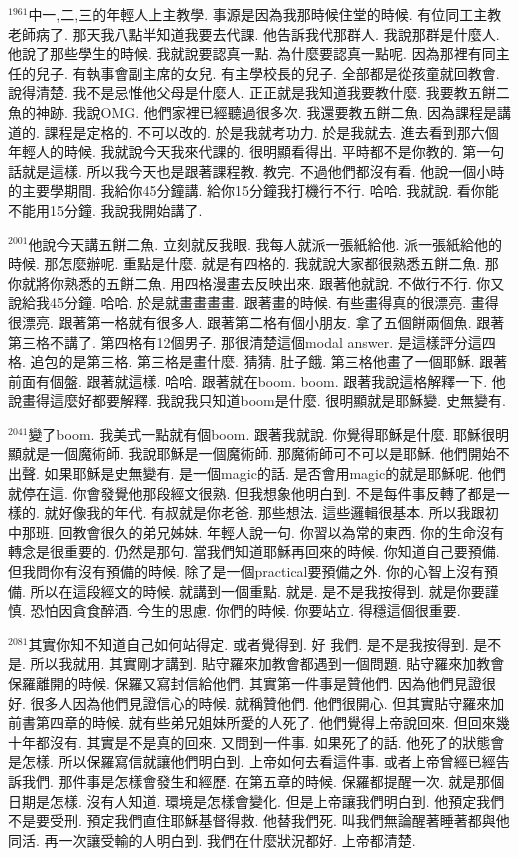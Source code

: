 \documentclass{book}
\begin{document}
$^{1961}$中一,二,三的年輕人上主教學.
事源是因為我那時候住堂的時候.
有位同工主教老師病了.
那天我八點半知道我要去代課.
他告訴我代那群人.
我說那群是什麼人.
他說了那些學生的時候.
我就說要認真一點.
為什麼要認真一點呢.
因為那裡有同主任的兒子.
有執事會副主席的女兒.
有主學校長的兒子.
全部都是從孩童就回教會.
說得清楚.
我不是忌惟他父母是什麼人.
正正就是我知道我要教什麼.
我要教五餅二魚的神跡.
我說OMG.
他們家裡已經聽過很多次.
我還要教五餅二魚.
因為課程是講道的.
課程是定格的.
不可以改的.
於是我就考功力.
於是我就去.
進去看到那六個年輕人的時候.
我就說今天我來代課的.
很明顯看得出.
平時都不是你教的.
第一句話就是這樣.
所以我今天也是跟著課程教.
教完.
不過他們都沒有看.
他說一個小時的主要學期間.
我給你45分鐘講.
給你15分鐘我打機行不行.
哈哈.
我就說.
看你能不能用15分鐘.
我說我開始講了.

$^{2001}$他說今天講五餅二魚.
立刻就反我眼.
我每人就派一張紙給他.
派一張紙給他的時候.
那怎麼辦呢.
重點是什麼.
就是有四格的.
我就說大家都很熟悉五餅二魚.
那你就將你熟悉的五餅二魚.
用四格漫畫去反映出來.
跟著他就說.
不做行不行.
你又說給我45分鐘.
哈哈.
於是就畫畫畫畫.
跟著畫的時候.
有些畫得真的很漂亮.
畫得很漂亮.
跟著第一格就有很多人.
跟著第二格有個小朋友.
拿了五個餅兩個魚.
跟著第三格不講了.
第四格有12個男子.
那很清楚這個modal answer.
是這樣評分這四格.
追包的是第三格.
第三格是畫什麼.
猜猜.
肚子餓.
第三格他畫了一個耶穌.
跟著前面有個盤.
跟著就這樣.
哈哈.
跟著就在boom.
boom.
跟著我說這格解釋一下.
他說畫得這麼好都要解釋.
我說我只知道boom是什麼.
很明顯就是耶穌變.
史無變有.

$^{2041}$變了boom.
我美式一點就有個boom.
跟著我就說.
你覺得耶穌是什麼.
耶穌很明顯就是一個魔術師.
我說耶穌是一個魔術師.
那魔術師可不可以是耶穌.
他們開始不出聲.
如果耶穌是史無變有.
是一個magic的話.
是否會用magic的就是耶穌呢.
他們就停在這.
你會發覺他那段經文很熟.
但我想象他明白到.
不是每件事反轉了都是一樣的.
就好像我的年代.
有叔就是你老爸.
那些想法.
這些邏輯很基本.
所以我跟初中那班.
回教會很久的弟兄姊妹.
年輕人說一句.
你習以為常的東西.
你的生命沒有轉念是很重要的.
仍然是那句.
當我們知道耶穌再回來的時候.
你知道自己要預備.
但我問你有沒有預備的時候.
除了是一個practical要預備之外.
你的心智上沒有預備.
所以在這段經文的時候.
就講到一個重點.
就是.
是不是我按得到.
就是你要謹慎.
恐怕因貪食醉酒.
今生的思慮.
你們的時候.
你要站立.
得穩這個很重要.

$^{2081}$其實你知不知道自己如何站得定.
或者覺得到.
好 我們.
是不是我按得到.
是不是.
所以我就用.
其實剛才講到.
貼守羅來加教會都遇到一個問題.
貼守羅來加教會保羅離開的時候.
保羅又寫封信給他們.
其實第一件事是贊他們.
因為他們見證很好.
很多人因為他們見證信心的時候.
就稱贊他們.
他們很開心.
但其實貼守羅來加前書第四章的時候.
就有些弟兄姐妹所愛的人死了.
他們覺得上帝說回來.
但回來幾十年都沒有.
其實是不是真的回來.
又問到一件事.
如果死了的話.
他死了的狀態會是怎樣.
所以保羅寫信就讓他們明白到.
上帝如何去看這件事.
或者上帝曾經已經告訴我們.
那件事是怎樣會發生和經歷.
在第五章的時候.
保羅都提醒一次.
就是那個日期是怎樣.
沒有人知道.
環境是怎樣會變化.
但是上帝讓我們明白到.
他預定我們不是要受刑.
預定我們直住耶穌基督得救.
他替我們死.
叫我們無論醒著睡著都與他同活.
再一次讓受輸的人明白到.
我們在什麼狀況都好.
上帝都清楚.
\end{document}
